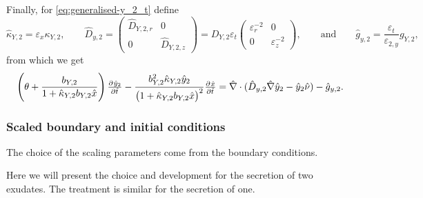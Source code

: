 \documentclass[11pt]{article}
\begin{document}
Finally, for \eqref{eq:generalised-y_2_t} define
\[
    \hat{\kappa}_{Y,2} = \varepsilon_{x} \kappa_{Y,2},
    \qquad
    \hat{D}_{y,2} = 
    \begin{pmatrix}
         \hat{D}_{Y,2,r} & 0 
         \\
        0 &  \hat{D}_{Y,2,z}
    \end{pmatrix}
    =
    D_{Y,2} \varepsilon_t
    \begin{pmatrix}
         \varepsilon_r^{-2} & 0 
         \\
        0 &  \varepsilon_z^{-2}
    \end{pmatrix},
    \qquad\text{and}\qquad
    \hat{g}_{y,2} = \frac{\varepsilon_t}{\varepsilon_{2,y}} g_{Y,2},
\]
from which we get
\begin{equation}
    \left(\theta + \frac{b_{Y,2}}{1 + \hat{\kappa}_{Y,2} b_{Y,2} \hat{x}}\right) \pd{\hat{y}_2}{\hat{t}}
    - 
    \frac{ b_{Y,2}^2 \hat{\kappa}_{Y,2} \hat{y}_2 }{\big(1 + \hat{\kappa}_{Y,2} b_{Y,2} \hat{x} \big)^2} \pd{\hat{x}}{\hat{t}} 
    = 
    \hat{\nabla} \cdot(\hat{D}_{y,2} \hat{\nabla} \hat{y}_{2} - \hat{y}_2 \hat{\nu}  ) - \hat{g}_{y,2}.
\end{equation}



\subsubsection{Scaled boundary and initial conditions}

The choice of the scaling parameters come from the boundary conditions. 



Here we will present the choice and development for the secretion of two exudates. The treatment is similar for the secretion of one. 
\end{document}
